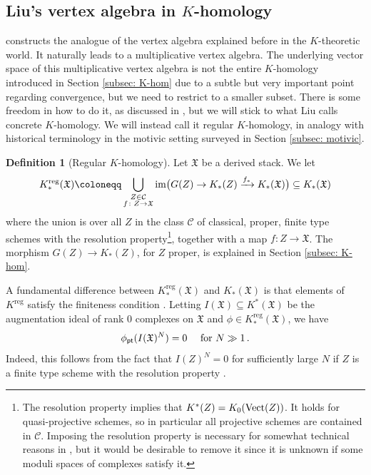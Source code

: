 \documentclass[12pt]{amsart}
\theoremstyle{definition}
\newtheorem{definition}{Definition}[section]
\newcommand{\Vectb}{\textup{Vect}}
\newcommand{\1}{\mathbf 1}
\newcommand{\FX}{{\mathfrak{X}}}
\newcommand{\pt}{{\mathsf{pt}}}
\newcommand{\reg}{\mathrm{reg}}
\begin{document}
\subsection{Liu's vertex algebra in $K$-homology}
\label{subsec: LiuVA}
\cite{Liu} constructs the analogue of the vertex algebra explained before in the $K$-theoretic world. It naturally leads to a multiplicative vertex algebra. The underlying vector space of this multiplicative vertex algebra is not the entire $K$-homology introduced in Section \ref{subsec: K-hom} due to a subtle but very important point regarding convergence, but we need to restrict to a smaller subset. There is some freedom in how to do it, as discussed in \cite[Section 2.2.3]{Liu}, but we will stick to what Liu calls concrete $K$-homology. We will instead call it regular $K$-homology, in analogy with historical terminology in the motivic setting surveyed in Section \ref{subsec: motivic}.
\begin{definition}[Regular $K$-homology]\label{def: regularKhom}
  Let $\FX$ be a derived stack. We let  
\[K_\ast^\reg(\FX)\coloneqq \bigcup_{\substack{Z\in \mathcal C\\
f\colon Z\to \FX}} \textup{im}\big(G(Z)\rightarrow K_\ast(Z)\xrightarrow{f_\ast}K_\ast(\FX)\big)\subseteq K_\ast(\FX)\]
where the union is over all $Z$ in the class $\mathcal C$ of classical, proper, finite type schemes with the resolution property\footnote{The resolution property \cite{totaroresolution} implies that $K^\ast(Z)=K_0(\Vectb(Z))$. It holds for quasi-projective schemes, so in particular all projective schemes are contained in $\mathcal C$. Imposing the resolution property is necessary for somewhat technical reasons in \cite{Liu}, but it would be desirable to remove it since it is unknown if some moduli spaces of complexes satisfy it.}, together with a map $f\colon Z\to \FX$. The morphism $G(Z)\to K_\ast(Z)$, for $Z$ proper, is explained in Section \ref{subsec: K-hom}. 
\end{definition}

A fundamental difference between $K^\reg_\ast(\FX)$ and $K_\ast(\FX)$ is that elements of $K^\reg$ satisfy the finiteness condition \cite[Definition 2.2.2 (iii)]{Liu}. Letting $I(\FX)\subseteq K^\ast(\FX)$ be the augmentation ideal of rank 0 complexes on $\FX$ and $\phi\in K_\ast^\reg(\FX)$, we have 
\begin{equation}
    \label{eq: finiteness}\phi_\pt(I(\FX)^N)=0 \quad \textup{ for }N\gg 1\,.
    \end{equation}
Indeed, this follows from the fact that $I(Z)^N=0$ for sufficiently large $N$ if $Z$ is a finite type scheme with the resolution property \cite[Lemma 2.1.7]{Liu}.
\end{document}
